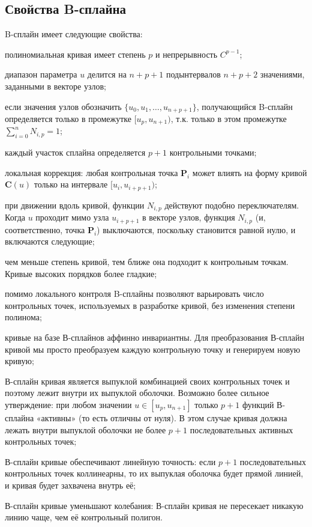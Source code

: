 \documentclass{bmstu}
\newenvironment{gost-itemize}
{\begin{itemize}[label=---,itemindent=\parindent,leftmargin=0pt]}
	{\end{itemize}}
\begin{document}
\subsection{Свойства B-сплайна}
B-сплайн имеет следующие свойства:
\begin{gost-itemize}
    \item полиномиальная кривая имеет степень $p$ и непрерывность $C^{p-1}$;
    \item диапазон параметра $u$ делится на $n + p + 1 $ подынтервалов $n + p + 2$ значениями, заданными в векторе узлов;
    \item если значения узлов обозначить $\{u_0, u_1,\dots, u_{n+p+1}\}$, получающийся B-сплайн определяется только в промежутке $[u_p, u_{n+1})$, т.к. только в этом промежутке $\sum\limits_{i=0}^nN_{i,p}=1$;
    \item каждый участок сплайна определяется $p + 1$ контрольными точками;
    \item локальная коррекция: любая контрольная точка $\mathbf{P}_i$ может влиять на форму кривой $\mathbf{C}(u)$ только на интервале $[u_i, u_{i+p+1})$;
    \item при движении вдоль кривой, функции $N_{i,p}$ действуют подобно
    переключателям. Когда $u$ проходит мимо узла $u_{i+p+1}$ в векторе узлов,
    функция $N_{i,p}$ (и, соответственно, точка $\mathbf{P}_i$) выключаются, поскольку становится равной нулю, и включаются следующие;
    \item чем меньше степень кривой, тем ближе она подходит к контрольным
    точкам. Кривые высоких порядков более гладкие;
    \item помимо локального контроля B-сплайны позволяют варьировать число
    контрольных точек, используемых в разработке кривой, без изменения
    степени полинома;
    \item кривые на базе В-сплайнов аффинно инвариантны. Для
    преобразования В-сплайн кривой мы просто преобразуем каждую
    контрольную точку и генерируем новую кривую;
    \item В-сплайн кривая является выпуклой комбинацией своих контрольных
    точек и поэтому лежит внутри их выпуклой оболочки. Возможно
    более сильное утверждение: при любом значении $u \in [u_p, u_{n+1}]$ только
    $p + 1$ функций В-сплайна «активны» (то есть отличны от нуля). В
    этом случае кривая должна лежать внутри выпуклой оболочки не
    более $p + 1$ последовательных активных контрольных точек;
    \item В-сплайн кривые обеспечивают линейную точность: если $p + 1$
последовательных контрольных точек коллинеарны, то их выпуклая
оболочка будет прямой линией, и кривая будет захвачена внутрь её;
\item В-сплайн кривые уменьшают колебания: В-сплайн кривая не
пересекает никакую линию чаще, чем её контрольный полигон.
\end{gost-itemize}
\end{document}
